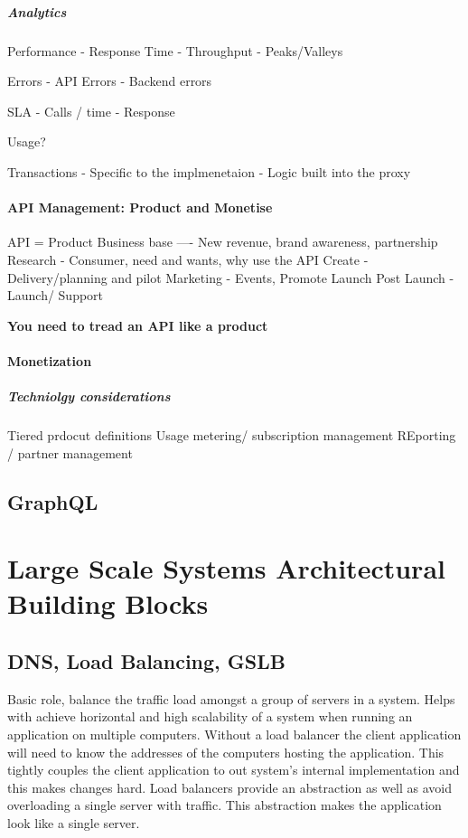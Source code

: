 \documentclass[a4paper, 11pt]{book}
\begin{document}
    \paragraph{Analytics}
    Performance
    - Response Time
    - Throughput
    - Peaks/Valleys

    Errors
    - API Errors
    - Backend errors

    SLA
    - Calls / time
    - Response

    Usage?

    Transactions
    - Specific to the implmenetaion
    - Logic built into the proxy

    \subsubsection{API Management: Product and Monetise}
    API = Product
    Business base ---- New revenue, brand awareness, partnership
    Research - Consumer, need and wants, why use the API
    Create - Delivery/planning and pilot
    Marketing - Events, Promote
    Launch Post Launch - Launch/ Support

    \textbf{You need to tread an API like a product}

    \subsubsection{Monetization}

    \paragraph{Techniolgy considerations}
    Tiered prdocut definitions
    Usage metering/ subscription management
    REporting / partner management


    \section{GraphQL}

    


    \chapter{Large Scale Systems Architectural Building Blocks}


    \section{DNS, Load Balancing, GSLB}
    Basic role, balance the traffic load amongst a group of servers in a system.
    Helps with achieve horizontal and high scalability of a system when running an application on multiple computers.
    Without a load balancer the client application will need to know the addresses of the computers hosting the application.
    This tightly couples the client application to out system's internal implementation and this makes changes hard.
    Load balancers provide an abstraction as well as avoid overloading a single server with traffic.
    This abstraction makes the application look like a single server.
\end{document}

